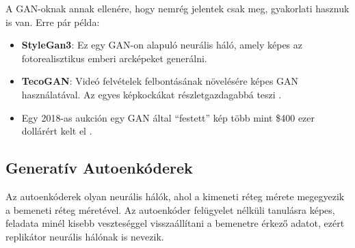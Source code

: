 
A GAN-oknak annak ellenére, hogy nemrég jelentek csak meg, gyakorlati hasznuk is van. Erre pár példa:
\begin{itemize}
	\item \textbf{StyleGan3}: Ez egy GAN-on alapuló neurális háló, amely képes az fotorealisztikus emberi arcképeket generálni. \cite{stylegan3}
	\item \textbf{TecoGAN}: Videó felvételek felbontásának növelésére képes GAN használatával. Az egyes képkockákat részletgazdagabbá teszi \cite{chu2020tecoGAN}.
	\item Egy 2018-as aukción egy GAN által ``festett'' kép több mint \$400 ezer dollárért kelt el \cite{AIart}. 
\end{itemize}

\subsection{Generatív Autoenkóderek}

Az autoenkóderek olyan neurális hálók, ahol a kimeneti réteg mérete megegyezik a bemeneti réteg méretével. Az autoenkóder felügyelet nélküli tanulásra képes, feladata minél kisebb veszteséggel visszaállítani a bemenetre érkező adatot, ezért replikátor neurális hálónak is nevezik.




